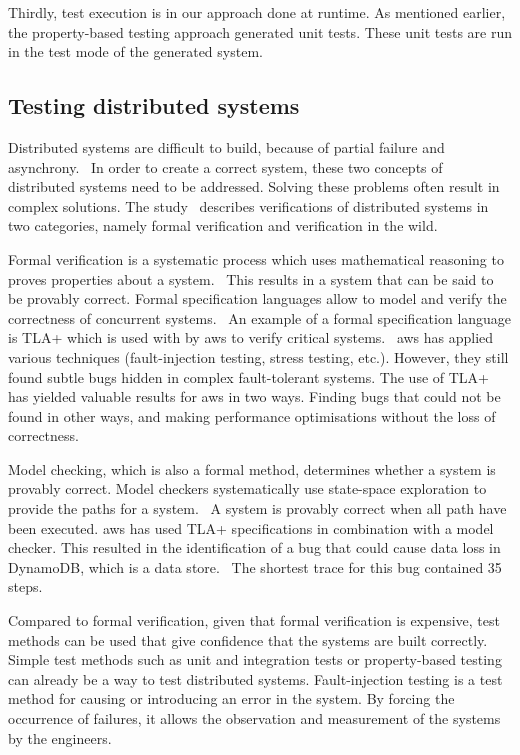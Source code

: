 Thirdly, test execution is in our approach done at runtime.
As mentioned earlier, the property-based testing approach generated unit tests.
These unit tests are run in the test mode of the generated system.

\subsection*{Testing distributed systems}

Distributed systems are difficult to build, because of partial failure and
asynchrony.~\cite[p.~1]{mccaffrey2016verification}
In order to create a correct system, these two concepts of distributed systems
need to be addressed. Solving these problems often result in complex solutions.
The study~\cite{mccaffrey2016verification} describes verifications of
distributed systems in two categories, namely formal verification and
verification in the wild.

Formal verification is a systematic process which uses mathematical reasoning to
proves properties about a system.~\cite{mccaffrey2016verification, sanghavi2010formal}
This results in a system that can be said to be provably correct.
Formal specification languages allow to model and verify the correctness of
concurrent systems.~\cite[p.~2]{mccaffrey2016verification}
An example of a formal specification language is TLA+ which is used with by
\gls{aws} to verify critical systems.~\cite[p.~1]{newcombe2014use}
\gls{aws} has applied various techniques (fault-injection testing, stress testing,
etc.). However, they still found subtle bugs hidden in complex fault-tolerant
systems.
The use of TLA+ has yielded valuable results for \gls{aws} in two ways. Finding
bugs that could not be found in other ways, and making performance optimisations
without the loss of correctness.~\cite[p.~3]{newcombe2014use}

Model checking, which is also a formal method, determines whether a system is
provably correct. Model checkers systematically use state-space exploration to
provide the paths for a system.~\cite[p.~3]{mccaffrey2016verification}
A system is provably correct when all path have been executed.
\gls{aws} has used TLA+ specifications in combination with a model checker. This
resulted in the identification of a bug that could cause data loss in DynamoDB,
which is a data store.~\cite[p.~7]{newcombe2014use}
The shortest trace for this bug contained 35 steps.

Compared to formal verification, given that formal verification is expensive,
test methods can be used that give confidence that the systems are built
correctly.~\cite[p.~4]{mccaffrey2016verification}
Simple test methods such as unit and integration tests or property-based testing
can already be a way to test distributed systems.
Fault-injection testing is a test method for causing or introducing an error in
the system. By forcing the occurrence of failures, it allows the observation
and measurement of the systems by the engineers.

